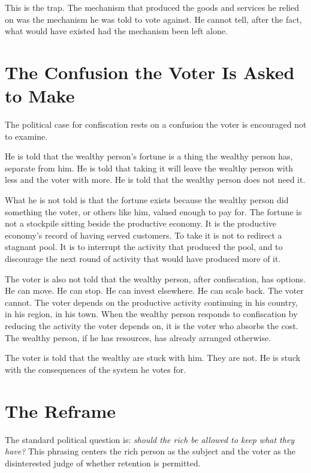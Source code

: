 \documentclass[11pt]{article}
\begin{document}
This is the trap. The mechanism that produced the goods and services he relied on was the mechanism he was told to vote against. He cannot tell, after the fact, what would have existed had the mechanism been left alone.

\section{The Confusion the Voter Is Asked to Make}

The political case for confiscation rests on a confusion the voter is encouraged not to examine.

He is told that the wealthy person's fortune is a thing the wealthy person has, separate from him. He is told that taking it will leave the wealthy person with less and the voter with more. He is told that the wealthy person does not need it.

What he is not told is that the fortune exists because the wealthy person did something the voter, or others like him, valued enough to pay for. The fortune is not a stockpile sitting beside the productive economy. It is the productive economy's record of having served customers. To take it is not to redirect a stagnant pool. It is to interrupt the activity that produced the pool, and to discourage the next round of activity that would have produced more of it.

The voter is also not told that the wealthy person, after confiscation, has options. He can move. He can stop. He can invest elsewhere. He can scale back. The voter cannot. The voter depends on the productive activity continuing in his country, in his region, in his town. When the wealthy person responds to confiscation by reducing the activity the voter depends on, it is the voter who absorbs the cost. The wealthy person, if he has resources, has already arranged otherwise.

The voter is told that the wealthy are stuck with him. They are not. He is stuck with the consequences of the system he votes for.

\section{The Reframe}

The standard political question is: \emph{should the rich be allowed to keep what they have?} This phrasing centers the rich person as the subject and the voter as the disinterested judge of whether retention is permitted.
\end{document}
